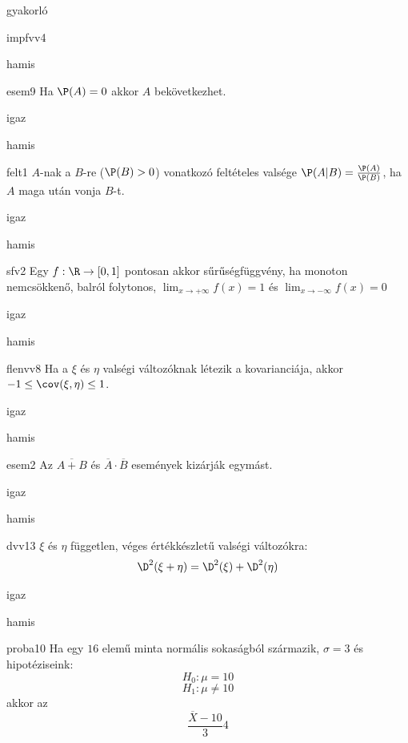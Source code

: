 \documentclass[12pt]{article}
\begin{document}
\begin{quiz}{gyakorló}
\begin{multi}[feedback={wiki}]{impfvv4}
\item* hamis
\end{multi}
\begin{multi}[feedback={Például: legyen a kísérlet random húzás a $[0,1]$-ből és $A=\{\frac{1}{2}\}$}]{esem9}
Ha $\P(A)=0$ akkor $A$ bekövetkezhet.
\item* igaz
\item hamis
\end{multi}
\begin{multi}[feedback={Def.+$P(AB)=P(A)$ a feltételekből.}]{felt1}
$A$-nak a $B$-re ($\P(B)>0$) vonatkozó feltételes valsége $\P(A|B)=\frac{\P(A)}{\P(B)}$, ha $A$ maga után vonja $B$-t.
\item* igaz
\item hamis
\end{multi}
\begin{multi}[feedback={Def.}]{sfv2}
Egy $f:\R\to [0,1]$ pontosan akkor sűrűségfüggvény, ha monoton nemcsökkenő, 
balról folytonos, $\lim_{x\to+\infty}f(x)=1$ és $\lim_{x\to-\infty}f(x)=0$
\item igaz
\item* hamis
\end{multi}
\begin{multi}[feedback={Ilyesmi a $\corr$-ra igaz.}]{flenvv8}
Ha a $\xi$ és $\eta$ valségi változóknak létezik a kovarianciája, akkor $-1\le \cov(\xi,\eta)\le 1$.
\item igaz
\item* hamis
\end{multi}
\begin{multi}[feedback={de-Morgan azonosság}]{esem2}
Az $\overline{A+B}$ és $\overline{A} \cdot \overline{B}$ események kizárják egymást.
\item igaz
\item* hamis
\end{multi}
\begin{multi}[feedback={Páronként független valségi változókra a szórásnégyzet additív.}]{dvv13}
$\xi$ és $\eta$ független, véges értékkészletű valségi változókra:
$$
\D^2(\xi+\eta)=\D^2(\xi)+\D^2(\eta)
$$
\item* igaz
\item hamis
\end{multi}
\begin{multi}[feedback={A feltételek mellett a fenti mennyiség sztenderd normális, ha $H_0$ igaz.}]{proba10}
Ha egy $16$ elemű minta normális sokaságból származik, $\sigma=3$ és hipotéziseink:
$$
H_0: \mu=10
$$
$$
H_1: \mu\neq 10
$$
akkor az 
$$
\frac{\overline{X}-10}{3}4
$$
\end{multi}
\end{quiz}
\end{document}
